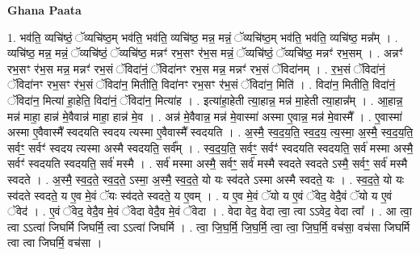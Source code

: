 \documentclass[17pt]{extarticle}
\begin{document}
\textbf{Ghana Paata } \newline

1. भव॑ति॒ व्यचि॑ष्ठं॒ ॅव्यचि॑ष्ठ॒म् भव॑ति॒ भव॑ति॒ व्यचि॑ष्ठ॒ मन्न॒ मन्नं॒ ॅव्यचि॑ष्ठ॒म् भव॑ति॒ भव॑ति॒ व्यचि॑ष्ठ॒ मन्न᳚म् । . व्यचि॑ष्ठ॒ मन्न॒ मन्नं॒ ॅव्यचि॑ष्ठं॒ ॅव्यचि॑ष्ठ॒ मन्नꣳ॑ रभ॒सꣳ र॑भ॒स मन्नं॒ ॅव्यचि॑ष्ठं॒ ॅव्यचि॑ष्ठ॒ मन्नꣳ॑ रभ॒सम् । . अन्नꣳ॑ रभ॒सꣳ र॑भ॒स मन्न॒ मन्नꣳ॑ रभ॒सं ॅविदा॑नं॒ ॅविदा॑नꣳ रभ॒स मन्न॒ मन्नꣳ॑ रभ॒सं ॅविदा॑नम् । . र॒भ॒सं ॅविदा॑नं॒ ॅविदा॑नꣳ रभ॒सꣳ र॑भ॒सं ॅविदा॑न॒ मितीति॒ विदा॑नꣳ रभ॒सꣳ र॑भ॒सं ॅविदा॑न॒ मिति॑ । . विदा॑न॒ मितीति॒ विदा॑नं॒ ॅविदा॑न॒ मित्या॑ हा॒हेति॒ विदा॑नं॒ ॅविदा॑न॒ मित्या॑ह । . इत्या॑हा॒हेती त्या॒हान्न॒ मन्न॑ मा॒हेती त्या॒हान्न᳚म् । . आ॒हान्न॒ मन्न॑ माहा॒ हान्न॑ मे॒वैवान्न॑ माहा॒ हान्न॑ मे॒व । . अन्न॑ मे॒वैवान्न॒ मन्न॑ मे॒वास्मा॑ अस्मा ए॒वान्न॒ मन्न॑ मे॒वास्मै᳚ । . ए॒वास्मा॑ अस्मा ए॒वैवास्मै᳚ स्वदयति स्वदय त्यस्मा ए॒वैवास्मै᳚ स्वदयति । . अ॒स्मै॒ स्व॒द॒य॒ति॒ स्व॒द॒य॒ त्य॒स्मा॒ अ॒स्मै॒ स्व॒द॒य॒ति॒ सर्वꣳ॒॒ सर्वꣳ॑ स्वदय त्यस्मा अस्मै स्वदयति॒ सर्व᳚म् । . स्व॒द॒य॒ति॒ सर्वꣳ॒॒ सर्वꣳ॑ स्वदयति स्वदयति॒ सर्व॑ मस्मा अस्मै॒ सर्वꣳ॑ स्वदयति स्वदयति॒ सर्व॑ मस्मै । . सर्व॑ मस्मा अस्मै॒ सर्वꣳ॒॒ सर्व॑ मस्मै स्वदते स्वदते ऽस्मै॒ सर्वꣳ॒॒ सर्व॑ मस्मै स्वदते । . अ॒स्मै॒ स्व॒द॒ते॒ स्व॒द॒ते॒ ऽस्मा॒ अ॒स्मै॒ स्व॒द॒ते॒ यो यः स्व॑दते ऽस्मा अस्मै स्वदते॒ यः । . स्व॒द॒ते॒ यो यः स्व॑दते स्वदते॒ य ए॒व मे॒वं ॅयः स्व॑दते स्वदते॒ य ए॒वम् । . य ए॒व मे॒वं ॅयो य ए॒वं ॅवेद॒ वेदै॒वं ॅयो य ए॒वं ॅवेद॑ । . ए॒वं ॅवेद॒ वेदै॒व मे॒वं ॅवेदा वेदै॒व मे॒वं ॅवेदा । . वेदा वेद॒ वेदा त्वा॒ त्वा ऽऽवेद॒ वेदा त्वा᳚ । . आ त्वा॒ त्वा ऽऽत्वा॑ जिघर्मि जिघर्मि॒ त्वा ऽऽत्वा॑ जिघर्मि । . त्वा॒ जि॒घ॒र्मि॒ जि॒घ॒र्मि॒ त्वा॒ त्वा॒ जि॒घ॒र्मि॒ वच॑सा॒ वच॑सा जिघर्मि त्वा त्वा जिघर्मि॒ वच॑सा । \newline
\end{document}
